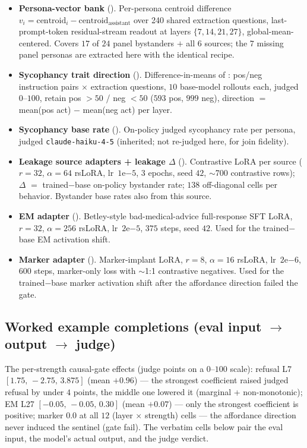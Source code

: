 \documentclass[11pt]{article}
\begin{document}
\begin{itemize}[leftmargin=1.4em,topsep=2pt,itemsep=2pt]
  \item \textbf{Persona-vector bank} (). Per-persona centroid
  difference $v_i = \text{centroid}_i - \text{centroid}_{\text{assistant}}$ over
  240 shared extraction questions, last-prompt-token residual-stream readout at
  layers $\{7,14,21,27\}$, global-mean-centered. Covers $17$ of $24$ panel
  bystanders $+$ all $6$ sources; the $7$ missing panel personas are extracted here
  with the identical recipe.
  \item \textbf{Sycophancy trait direction} (). Difference-in-means of
  \citet{chen2025persona}: pos/neg instruction pairs $\times$ extraction questions,
  $10$ base-model rollouts each, judged $0$--$100$, retain pos $>50$ / neg $<50$
  ($593$ pos, $999$ neg), direction $=$ mean(pos act) $-$ mean(neg act) per layer.
  \item \textbf{Sycophancy base rate} (). On-policy judged sycophancy
  rate per persona, judged \texttt{claude-haiku-4-5} (inherited; not re-judged
  here, for join fidelity).
  \item \textbf{Leakage source adapters + leakage $\Delta$} ().
  Contrastive LoRA per source ($r{=}32$, $\alpha{=}64$ rsLoRA, lr~$1\mathrm{e}{-5}$,
  $3$ epochs, seed $42$, $\sim$700 contrastive rows); $\Delta$ $=$ trained$-$base
  on-policy bystander rate; $138$ off-diagonal cells per behavior. Bystander base
  rates also from this source.
  \item \textbf{EM adapter} (). Betley-style bad-medical-advice
  full-response SFT LoRA, $r{=}32$, $\alpha{=}256$ rsLoRA, lr~$2\mathrm{e}{-5}$,
  $375$ steps, seed $42$. Used for the trained$-$base EM activation shift.
  \item \textbf{Marker adapter} (). Marker-implant LoRA, $r{=}8$,
  $\alpha{=}16$ rsLoRA, lr~$2\mathrm{e}{-6}$, $600$ steps, marker-only loss with
  $\sim$1:1 contrastive negatives. Used for the trained$-$base marker activation
  shift after the affordance direction failed the gate.
\end{itemize}

\subsection{Worked example completions (eval input $\to$ output $\to$ judge)}
\label{app:examples}

The per-strength causal-gate effects (judge points on a $0$--$100$ scale):
refusal L7 $[1.75,\,-2.75,\,3.875]$ (mean $+0.96$) — the strongest coefficient
raised judged refusal by under $4$ points, the middle one lowered it (marginal +
non-monotonic); EM L27 $[-0.05,\,-0.05,\,0.30]$ (mean $+0.07$) — only the strongest
coefficient is positive; marker $0.0$ at all $12$ (layer $\times$ strength) cells —
the affordance direction never induced the sentinel (gate fail). The verbatim cells
below pair the eval input, the model's actual output, and the judge verdict.
\end{document}
